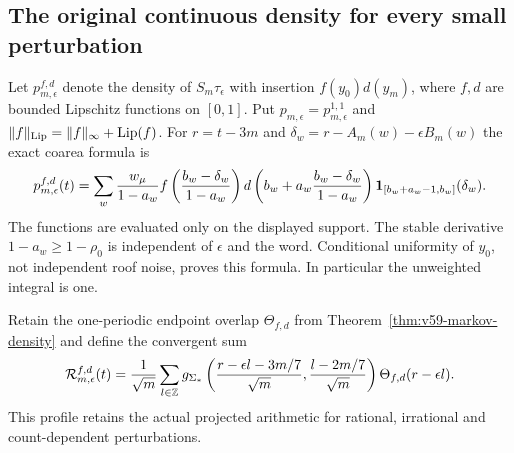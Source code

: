 \subsection{The original continuous density for every small perturbation}
Let $p_{m,\epsilon}^{f,d}$ denote the density of $S_m\tau_\epsilon$
with insertion $f(y_0)d(y_m)$, where $f,d$ are bounded Lipschitz
functions on $[0,1]$. Put $p_{m,\epsilon}=p_{m,\epsilon}^{1,1}$ and
$\|f\|_{\rm Lip}=\|f\|_\infty+\operatorname{Lip}(f)$.
For $r=t-3m$ and $\delta_w=r-A_m(w)-\epsilon B_m(w)$ the exact coarea
formula is
\begin{equation}\label{eq:v60-exact-perturbed-coarea}
 p_{m,\epsilon}^{f,d}(t)=
 \sum_w\frac{w_\mu}{1-a_w}
 f\left(\frac{b_w-\delta_w}{1-a_w}\right)
 d\left(b_w+a_w\frac{b_w-\delta_w}{1-a_w}\right)
 \one_{[b_w+a_w-1,b_w]}(\delta_w).
\end{equation}
The functions are evaluated only on the displayed support. The stable
derivative $1-a_w\ge1-\rho_0$ is independent of $\epsilon$ and the
word. Conditional uniformity of $y_0$, not independent roof noise,
proves this formula. In particular the unweighted integral is one.

Retain the one-periodic endpoint overlap $\Theta_{f,d}$ from
Theorem~\ref{thm:v59-markov-density} and define the convergent sum
\begin{equation}\label{eq:v60-arithmetic-profile}
 \mathcal R_{m,\epsilon}^{f,d}(t)=\frac{1}{\sqrt m}
 \sum_{l\in\Z}
 g_{\Sigma_*}\left(\frac{r-\epsilon l-3m/7}{\sqrt m},
                         \frac{l-2m/7}{\sqrt m}\right)
                         \Theta_{f,d}(r-\epsilon l).
\end{equation}
This profile retains the actual projected arithmetic for rational,
irrational and count-dependent perturbations.

